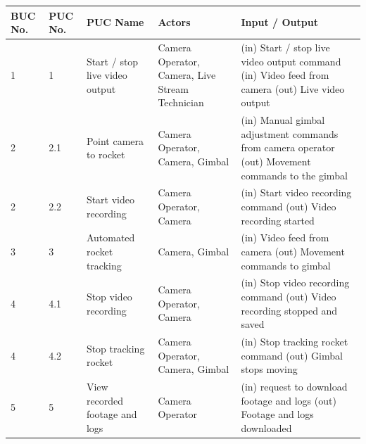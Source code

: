 \documentclass[12pt]{article}
\begin{document}
\begin{table}[H]
  \centering
  \setlength\extrarowheight{5mm}
  \begin{tabularx}{\textwidth}{p{0.4in}p{0.4in}p{1.25in}p{1in}X}
    \toprule \textbf{BUC No.}       & \textbf{PUC No.}        & \textbf{PUC Name}              &
    \textbf{Actors}                 & \textbf{Input / Output}                                    \\
    \midrule
    1                               & 1                       & Start / stop live video output &
    Camera Operator, Camera, Live Stream Technician
                                    &
    (in) Start / stop live video output command \newline
    (in) Video feed from camera \newline
    (out) Live video output                                                                      \\
    2                               & 2.1                     & Point camera to rocket         &
    Camera Operator, Camera, Gimbal
                                    &
    (in) Manual gimbal adjustment commands from camera operator \newline
    (out) Movement commands to the gimbal                                                        \\
    2                               & 2.2                     & Start video recording          &
    Camera Operator, Camera
                                    &
    (in) Start video recording command \newline
    (out) Video recording started                                                                \\
    3                               & 3                       & Automated rocket tracking      &
    Camera, Gimbal                  &
    (in) Video feed from camera \newline
    (out) Movement commands to gimbal                                                            \\
    4                               & 4.1                     & Stop video recording           &
    Camera Operator, Camera         &
    (in) Stop video recording command \newline
    (out) Video recording stopped and saved                                                      \\
    4                               & 4.2                     & Stop tracking rocket           &
    Camera Operator, Camera, Gimbal &
    (in) Stop tracking rocket command \newline
    (out) Gimbal stops moving                                                                    \\
    5                               & 5                       & View recorded footage and logs &
    Camera Operator                 &
    (in) request to download footage and logs \newline
    (out) Footage and logs downloaded                                                            \\


\end{tabularx}
\end{table}
\end{document}
